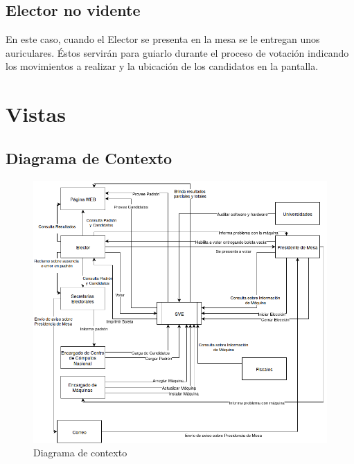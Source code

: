 \documentclass[spanish, 10pt,a4paper]{article}
\numberwithin{equation}{section} %
\begin{document}
\subsection{Elector no vidente}

	En este caso, cuando el Elector se presenta en la mesa se le entregan unos auriculares. Éstos servirán para guiarlo durante el proceso de votación indicando los movimientos a realizar y la ubicación de los candidatos en la pantalla.

\newpage
\section{Vistas}
\subsection{Diagrama de Contexto}

\begin{figure}[H]
  \centering
  \includegraphics[scale=0.50]{pdf/DiagramaDeContexto}
  \caption{Diagrama de contexto}
  \label{fig:DiagramaDeContexto}
\end{figure}
\end{document}
